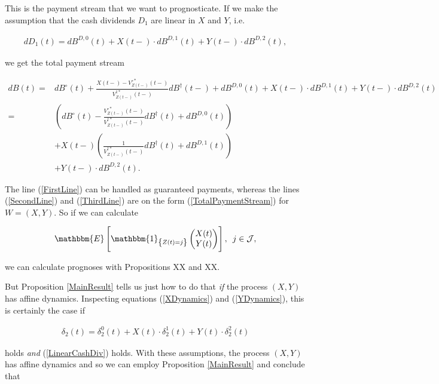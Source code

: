 \documentclass{book}
\newcommand{\1}[1]{\mathbbm{1}_{\left\lbrace #1 \right\rbrace}}
\newcommand{\expec}[1][def]{\mathbbm{E} \left[ #1 \right]}
\theoremstyle{break}
\theoremstyle{remark}
\numberwithin{equation}{section}
\begin{document}
This is the payment stream that we want to prognosticate. If we make the assumption that the cash dividends $D_1$ are linear in $X$ and $Y$, i.e.

\begin{align} \label{LinearCashDiv}
dD_1(t) = dB^{D,0}(t) + X(t-) \cdot dB^{D,1}(t) + Y(t-) \cdot dB^{D,2}(t),
\end{align}

we get the total payment stream

\begin{align}
dB(t) =& dB^\circ(t) + \frac{X(t-) - V_{Z(t-)}^{\circ*}(t-)}{V_{Z(t-)}^{\dagger*}(t-)} dB^\dagger(t-) + dB^{D,0}(t) + X(t-) \cdot dB^{D,1}(t) + Y(t-) \cdot dB^{D,2}(t) \nonumber \\
=& \left( dB^\circ(t) - \frac{V_{Z(t-)}^{\circ*}(t-)}{V_{Z(t-)}^{\dagger*}(t-)} dB^\dagger(t) + dB^{D,0}(t) \right) \label{FirstLine} \\
&+ X(t-) \left( \frac{1}{V_{Z(t-)}^{\dagger*}(t-)} dB^\dagger(t) + dB^{D,1}(t) \right) \label{SecondLine} \\
&+ Y(t-) \cdot dB^{D,2}(t). \label{ThirdLine}
\end{align}

The line (\ref{FirstLine}) can be handled as guaranteed payments, whereas the lines (\ref{SecondLine}) and (\ref{ThirdLine}) are on the form (\ref{TotalPaymentStream}) for $W=(X,Y)$. So if we can calculate
	
\begin{align*}
	\expec[\1{Z(t)=j}\begin{pmatrix}X(t) \\ Y(t)\end{pmatrix}], \, \, \, j \in \mathcal{J},
\end{align*}
	
we can calculate prognoses with Propositions XX and XX.


But Proposition \ref{MainResult} tells us just how to do that \textit{if} the process $(X,Y)$ has affine dynamics. Inspecting equations (\ref{XDynamics}) and (\ref{YDynamics}), this is certainly the case if

\begin{align*}
	\delta_2(t) = \delta_2^0(t) + X(t) \cdot \delta_2^1(t) + Y(t) \cdot \delta_2^2(t)
\end{align*}

holds \textit{and} (\ref{LinearCashDiv}) holds. With these assumptions, the process $(X,Y)$ has affine dynamics and so we can employ Proposition \ref{MainResult} and conclude that
\end{document}
